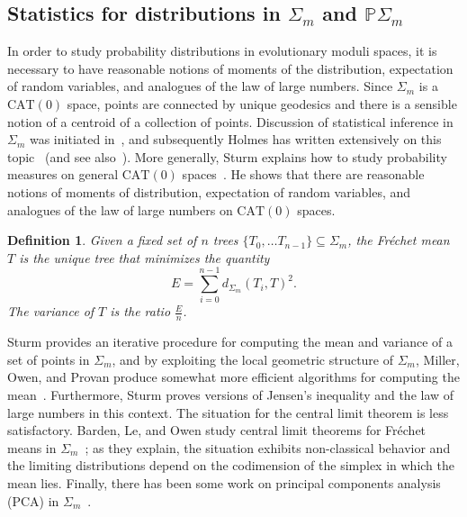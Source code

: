 \documentclass[a4paper,11pt]{article}
\newtheorem{definition}{Definition}
\newcommand{\CAT}{\textrm{CAT}}
\begin{document}
\subsection{Statistics for distributions in $\Sigma_m$ and $\mathbb{P}\Sigma_m$}

In order to study probability distributions in evolutionary moduli spaces, it is necessary to have reasonable notions of moments of the distribution, expectation of random variables, and analogues of the law of large numbers.
Since $\Sigma_m$ is a $\CAT(0)$ space, points are connected by unique
geodesics and there is a sensible notion of a centroid of a collection
of points.
Discussion of statistical inference in $\Sigma_m$ was initiated
in~\cite{billera2001geometry}, and subsequently Holmes has written
extensively on this topic~\cite{holmes2003bootstrapping,
  holmes2003bootstrapping, holmes2005statistical} (and see
also~\cite{feragen2013tree}).  More generally, Sturm explains how to
study probability measures on general $\CAT(0)$
spaces~\cite{sturm2003probability}.  He shows that there are
reasonable notions of moments of distribution, expectation of random
variables, and analogues of the law of large numbers on $\CAT(0)$
spaces.

\begin{definition}
Given a fixed set of $n$ trees $\{T_0, \ldots T_{n-1}\} \subseteq \Sigma_m$, the Fr\'echet mean $T$ is the unique tree that minimizes the quantity \[E = \sum_{i = 0}^{n-1} d_{\Sigma_m}(T_i, T)^2.\] 
The variance of $T$ is the ratio $\frac{E}{n}$.
\end{definition}

Sturm provides an iterative procedure for computing the mean and variance of a set of points in $\Sigma_m$, and by exploiting the local geometric structure of $\Sigma_m$, Miller, Owen, and Provan produce somewhat more efficient algorithms for computing the mean~\cite{miller2012polyhedral}.
Furthermore, Sturm proves versions of Jensen's inequality and the law
of large numbers in this context.  The situation for the central
limit theorem is less satisfactory.  Barden, Le, and Owen study
central limit theorems for Fr\'echet means in
$\Sigma_m$~\cite{barden2013mean}; as they explain, the situation
exhibits non-classical behavior and the limiting distributions depend
on the codimension of the simplex in which the mean lies.  Finally,
there has been some work on principal components analysis (PCA) in
$\Sigma_m$~\cite{Nye2011PCA}.
\end{document}
